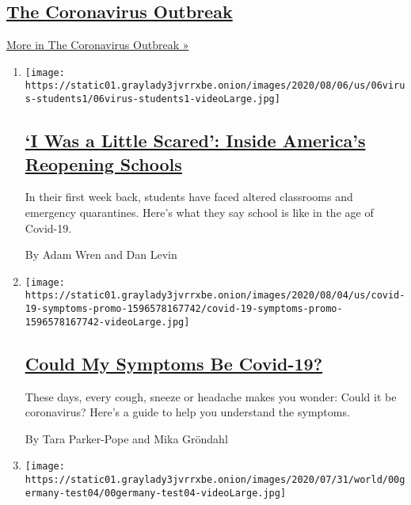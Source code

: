 \hypertarget{the-coronavirus-outbreak}{%
\subsection{\texorpdfstring{\href{/news-event/coronavirus}{The
Coronavirus
Outbreak}}{The Coronavirus Outbreak}}\label{the-coronavirus-outbreak}}

\href{/news-event/coronavirus}{More in The Coronavirus Outbreak »}

\begin{enumerate}
\def\labelenumi{\arabic{enumi}.}
\item
  \texttt{[image: https://static01.graylady3jvrrxbe.onion/images/2020/08/06/us/06virus-students1/06virus-students1-videoLarge.jpg]}

  \hypertarget{i-was-a-little-scared-inside-americas-reopening-schools}{%
  \subsection{\texorpdfstring{\href{/2020/08/06/us/coronavirus-students.html}{`I
  Was a Little Scared': Inside America's Reopening
  Schools}}{`I Was a Little Scared': Inside America's Reopening Schools}}\label{i-was-a-little-scared-inside-americas-reopening-schools}}

  In their first week back, students have faced altered classrooms and
  emergency quarantines. Here's what they say school is like in the age
  of Covid-19.

  By Adam Wren and Dan Levin
\item
  \texttt{[image: https://static01.graylady3jvrrxbe.onion/images/2020/08/04/us/covid-19-symptoms-promo-1596578167742/covid-19-symptoms-promo-1596578167742-videoLarge.jpg]}

  \hypertarget{could-my-symptoms-be-covid-19-1}{%
  \subsection{\texorpdfstring{\href{/interactive/2020/08/05/well/covid-19-symptoms.html}{Could
  My Symptoms Be
  Covid-19?}}{Could My Symptoms Be Covid-19?}}\label{could-my-symptoms-be-covid-19-1}}

  These days, every cough, sneeze or headache makes you wonder: Could it
  be coronavirus? Here's a guide to help you understand the symptoms.

  By Tara Parker-Pope and Mika Gröndahl
\item
  \texttt{[image: https://static01.graylady3jvrrxbe.onion/images/2020/07/31/world/00germany-test04/00germany-test04-videoLarge.jpg]}


\end{enumerate}
